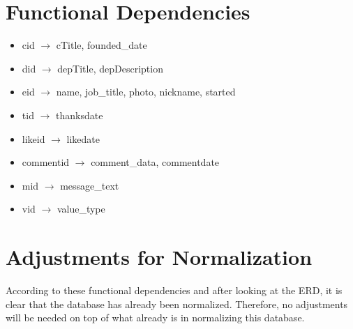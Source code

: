 \documentclass[11pt]{report}
\begin{document}
\section{Functional Dependencies}
\begin{itemize}
\item cid $\rightarrow$ cTitle, founded\_date
\item did $\rightarrow$ depTitle, depDescription
\item eid $\rightarrow$ name, job\_title, photo, nickname, started
\item tid $\rightarrow$ thanksdate
\item likeid $\rightarrow$ likedate
\item commentid $\rightarrow$ comment\_data, commentdate
\item mid $\rightarrow$ message\_text
\item vid $\rightarrow$ value\_type
\end{itemize}
\section{Adjustments for Normalization}
According to these functional dependencies and after looking at the ERD, it is clear that the database has already been normalized. Therefore, no adjustments will be needed on top of what already is in normalizing this database.
\end{document}
